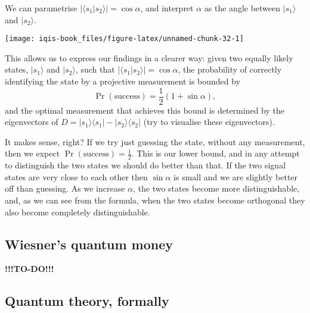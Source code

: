 \documentclass[fleqn]{article}
\begin{document}
We can parametrise \(|\langle s_1|s_2\rangle| = \cos\alpha\), and interpret \(\alpha\) as the angle between \(|s_1\rangle\) and \(|s_2\rangle\).

\begin{center}\texttt{[image: iqis-book\_files/figure-latex/unnamed-chunk-32-1]} \end{center}

This allows us to express our findings in a clearer way: given two equally likely states, \(|s_1\rangle\) and \(|s_2\rangle\), such that \(|\langle s_1|s_2\rangle| = \cos\alpha\), the probability of correctly identifying the state by a projective measurement is bounded by
\[
 \Pr (\text{success})
 = \frac12(1 + \sin\alpha),
\]
and the optimal measurement that achieves this bound is determined by the eigenvectors of \(D = |s_1\rangle\langle s_1|-|s_2\rangle\langle s_2|\) (try to visualise these eigenvectors).

It makes sense, right?
If we try just guessing the state, without any measurement, then we expect \(\Pr (\text{success}) = \frac12\).
This is our lower bound, and in any attempt to distinguish the two states we should do better than that.
If the two signal states are very close to each other then \(\sin\alpha\) is small and we are slightly better off than guessing.
As we increase \(\alpha\), the two states become more distinguishable, and, as we can see from the formula, when the two states become orthogonal they also become completely distinguishable.

\hypertarget{wiesners-quantum-money}{%
\subsection{Wiesner's quantum money}\label{wiesners-quantum-money}}

\textbf{!!!TO-DO!!!}

\hypertarget{quantum-theory-formally}{%
\subsection{Quantum theory, formally}\label{quantum-theory-formally}}
\end{document}
